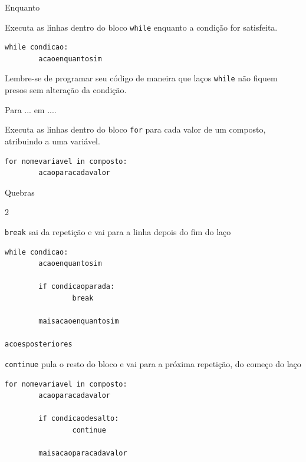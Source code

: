 \begin{frame}[containsverbatim]{Enquanto}				
		
		Executa as linhas dentro do bloco \texttt{while} enquanto a condição for satisfeita.	
		
		\begin{verbatim}
while condicao:
		acaoenquantosim
		\end{verbatim}
		
		Lembre-se de programar seu código de maneira que laços \texttt{while} não fiquem presos sem alteração da condição.		
				 				 		
  \end{frame}

\begin{frame}[containsverbatim]{Para ... em ....}				
	
	Executa as linhas dentro do bloco \texttt{for} para cada valor de um composto, atribuindo a uma variável.	
	
	\begin{verbatim}
for nomevariavel in composto:
		acaoparacadavalor
	\end{verbatim}				
	
	
	
	
  \end{frame}
  
  
\begin{frame}[containsverbatim]{Quebras}				
\begin{multicols}{2}	
	
	\texttt{break} sai da repetição e vai para a linha depois do fim do laço	
	
\begin{verbatim}
while condicao:
		acaoenquantosim
		
		if condicaoparada:
				break 
				
		maisacaoenquantosim
		
acoesposteriores				
\end{verbatim}	
	
	\texttt{continue} pula o resto do bloco e vai para a próxima repetição, do começo do laço 				

\begin{verbatim}
for nomevariavel in composto:
		acaoparacadavalor
	
		if condicaodesalto:
				continue 
		
		maisacaoparacadavalor						
\end{verbatim}

\end{multicols}	
\end{frame}  

